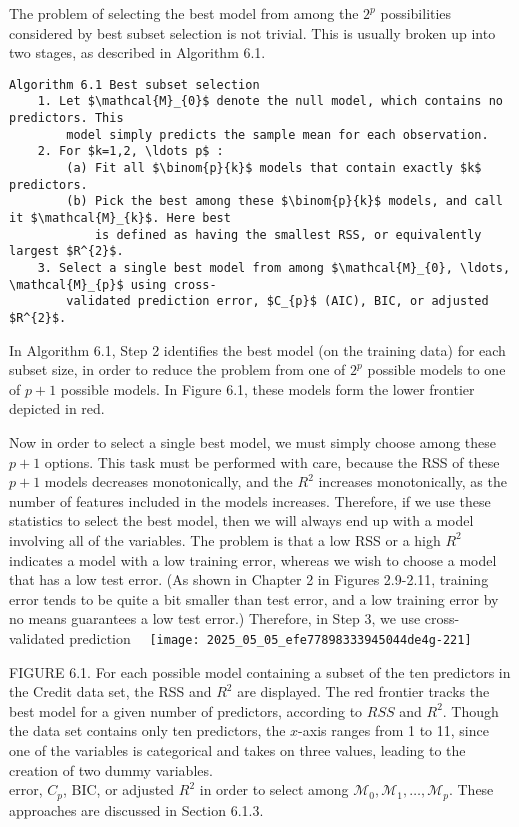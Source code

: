 \documentclass[10pt]{article}
\begin{document}
The problem of selecting the best model from among the $2^{p}$ possibilities considered by best subset selection is not trivial. This is usually broken up into two stages, as described in Algorithm 6.1.

\begin{verbatim}
Algorithm 6.1 Best subset selection
    1. Let $\mathcal{M}_{0}$ denote the null model, which contains no predictors. This
        model simply predicts the sample mean for each observation.
    2. For $k=1,2, \ldots p$ :
        (a) Fit all $\binom{p}{k}$ models that contain exactly $k$ predictors.
        (b) Pick the best among these $\binom{p}{k}$ models, and call it $\mathcal{M}_{k}$. Here best
            is defined as having the smallest RSS, or equivalently largest $R^{2}$.
    3. Select a single best model from among $\mathcal{M}_{0}, \ldots, \mathcal{M}_{p}$ using cross-
        validated prediction error, $C_{p}$ (AIC), BIC, or adjusted $R^{2}$.
\end{verbatim}

In Algorithm 6.1, Step 2 identifies the best model (on the training data) for each subset size, in order to reduce the problem from one of $2^{p}$ possible models to one of $p+1$ possible models. In Figure 6.1, these models form the lower frontier depicted in red.

Now in order to select a single best model, we must simply choose among these $p+1$ options. This task must be performed with care, because the RSS of these $p+1$ models decreases monotonically, and the $R^{2}$ increases monotonically, as the number of features included in the models increases. Therefore, if we use these statistics to select the best model, then we will always end up with a model involving all of the variables. The problem is that a low RSS or a high $R^{2}$ indicates a model with a low training error, whereas we wish to choose a model that has a low test error. (As shown in Chapter 2 in Figures 2.9-2.11, training error tends to be quite a bit smaller than test error, and a low training error by no means guarantees a low test error.) Therefore, in Step 3, we use cross-validated prediction\
\
\texttt{[image: 2025\_05\_05\_efe77898333945044de4g-221]}

FIGURE 6.1. For each possible model containing a subset of the ten predictors in the Credit data set, the RSS and $R^{2}$ are displayed. The red frontier tracks the best model for a given number of predictors, according to $R S S$ and $R^{2}$. Though the data set contains only ten predictors, the $x$-axis ranges from 1 to 11, since one of the variables is categorical and takes on three values, leading to the creation of two dummy variables.\\
error, $C_{p}$, BIC, or adjusted $R^{2}$ in order to select among $\mathcal{M}_{0}, \mathcal{M}_{1}, \ldots, \mathcal{M}_{p}$. These approaches are discussed in Section 6.1.3.
\end{document}
